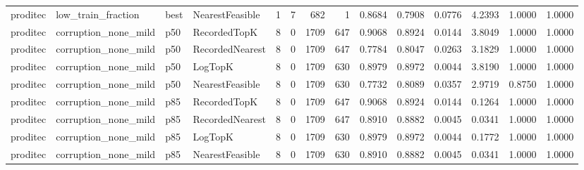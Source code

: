 \begin{tabular}{llllrrrrrrrrrr}
proditec &   low\_train\_fraction &   best & NearestFeasible &           1 &          7 &            682 &                   1 &         0.8684 &          0.7908 &                    0.0776 &         4.2393 &                 1.0000 &                  1.0000 \\
proditec & corruption\_none\_mild &    p50 &    RecordedTopK &           8 &          0 &           1709 &                 647 &         0.9068 &          0.8924 &                    0.0144 &         3.8049 &                 1.0000 &                  1.0000 \\
proditec & corruption\_none\_mild &    p50 & RecordedNearest &           8 &          0 &           1709 &                 647 &         0.7784 &          0.8047 &                    0.0263 &         3.1829 &                 1.0000 &                  1.0000 \\
proditec & corruption\_none\_mild &    p50 &         LogTopK &           8 &          0 &           1709 &                 630 &         0.8979 &          0.8972 &                    0.0044 &         3.8190 &                 1.0000 &                  1.0000 \\
proditec & corruption\_none\_mild &    p50 & NearestFeasible &           8 &          0 &           1709 &                 630 &         0.7732 &          0.8089 &                    0.0357 &         2.9719 &                 0.8750 &                  1.0000 \\
proditec & corruption\_none\_mild &    p85 &    RecordedTopK &           8 &          0 &           1709 &                 647 &         0.9068 &          0.8924 &                    0.0144 &         0.1264 &                 1.0000 &                  1.0000 \\
proditec & corruption\_none\_mild &    p85 & RecordedNearest &           8 &          0 &           1709 &                 647 &         0.8910 &          0.8882 &                    0.0045 &         0.0341 &                 1.0000 &                  1.0000 \\
proditec & corruption\_none\_mild &    p85 &         LogTopK &           8 &          0 &           1709 &                 630 &         0.8979 &          0.8972 &                    0.0044 &         0.1772 &                 1.0000 &                  1.0000 \\
proditec & corruption\_none\_mild &    p85 & NearestFeasible &           8 &          0 &           1709 &                 630 &         0.8910 &          0.8882 &                    0.0045 &         0.0341 &                 1.0000 &                  1.0000 \\

\end{tabular}
